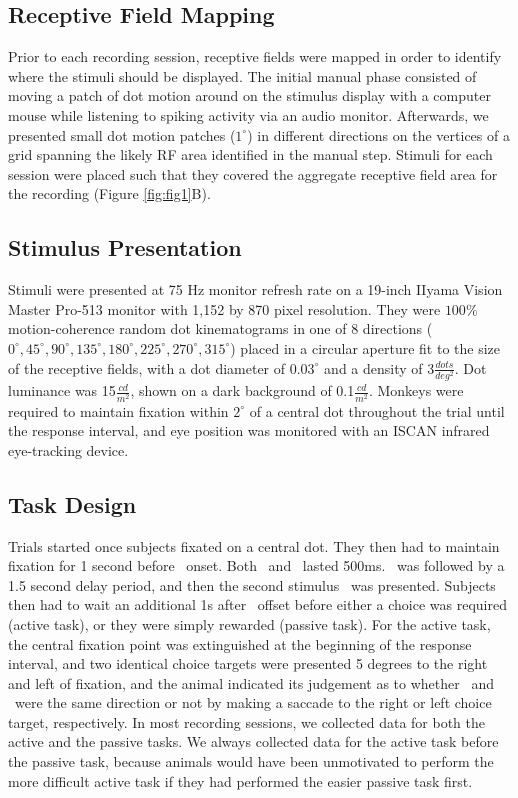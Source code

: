 \subsection*{Receptive Field Mapping}
Prior to each recording session, receptive fields were mapped in order to identify where the stimuli should be displayed. The initial manual phase consisted of moving a patch of dot motion around on the stimulus display with a computer mouse while listening to spiking activity via an audio monitor. Afterwards, we presented small dot motion patches ($1^{\circ}$) in different directions on the vertices of a grid spanning the likely RF area identified in the manual step. Stimuli for each session were placed such that they covered the aggregate receptive field area for the recording (Figure \ref{fig:fig1}B).

\subsection*{Stimulus Presentation}
Stimuli were presented at 75 Hz monitor refresh rate on a 19-inch IIyama Vision Master Pro-513 monitor with 1,152 by 870 pixel resolution. They were $100\%$ motion-coherence random dot kinematograms in one of 8 directions ($0^\circ, 45^\circ, 90^\circ, 135^\circ, 180^\circ, 225^\circ, 270^\circ, 315^\circ$) placed in a circular aperture fit to the size of the receptive fields, with a dot diameter of $0.03^{\circ}$ and a density of 3$\frac{dots}{deg^2}$. Dot luminance was 15$\frac{cd}{m^2}$, shown on a dark background of 0.1$\frac{cd}{m^2}$. Monkeys were required to maintain fixation within $2^{\circ}$ of a central dot throughout the trial until the response interval, and eye position was monitored with an ISCAN infrared eye-tracking device.

\subsection*{Task Design}
Trials started once subjects fixated on a central dot. They then had to maintain fixation for 1 second before \sample\ onset. Both \sample\ and \test\ lasted 500ms. \sample\ was followed by a 1.5 second delay period, and then the second stimulus \test\ was presented. Subjects then had to wait an additional 1s after \test\ offset before either a choice was required (active task), or they were simply rewarded (passive task). For the active task, the central fixation point was extinguished at the beginning of the response interval, and two identical choice targets were presented 5 degrees to the right and left of fixation, and the animal indicated its judgement as to whether \sample\ and \test\ were the same direction or not by making a saccade to the right or left choice target, respectively. In most recording sessions, we collected data for both the active and the passive tasks. We always collected data for the active task before the passive task, because animals would have been unmotivated to perform the more difficult active task if they had performed the easier passive task first.

